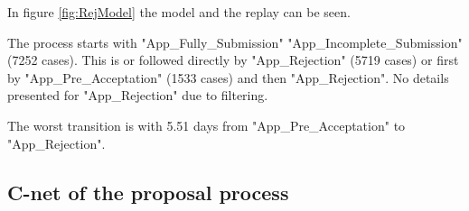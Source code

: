 In figure \ref{fig:RejModel} the model and the replay can be seen. 

The process starts with "App\_Fully\_Submission" \textrightarrow "App\_Incomplete\_Submission" (7252 cases). This is or followed directly by "App\_Rejection" (5719 cases) or first by "App\_Pre\_Acceptation" (1533 cases) and then "App\_Rejection". No details presented for "App\_Rejection" due to filtering.

The worst transition is with 5.51 days from "App\_Pre\_Acceptation" to "App\_Rejection".

\subsection{C-net of the proposal process}

